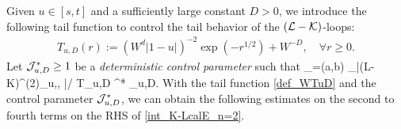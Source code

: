 Given $u\in[s,t]$ and a sufficiently large constant $D>0$, we introduce the following tail function to control the tail behavior of the $(\cL-\cK)$-loops: 
\begin{align}   %
{T} _{u, D} (r) :=  (W^d|1-u|)^{-2}
\exp(- r^{1/2})+W^{-D},\quad \forall r\ge 0 .\label{def_WTuD}
\end{align} 
Let ${\cal J}^* _{u,D}\ge 1$ be a \emph{deterministic control parameter} such that 
\be\label{eq:def_new_J*}
\max_{\ba=(a,b)} \max_{\bsig}{\big|\left({\cal L-\cal K}\right)^{(2)}_{u,\bsig, \ba}\big|}\big/{ T}_{u,D} ^* _{u,D}.
\ee
With the tail function \eqref{def_WTuD} and the control parameter ${\cal J}^* _{u,D}$, we can obtain the following estimates on the second to fourth terms on the RHS of \eqref{int_K-LcalE_n=2}. 


